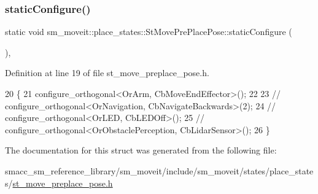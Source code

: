 \subsubsection{\texorpdfstring{static\+Configure()}{staticConfigure()}}
{\footnotesize\ttfamily static void sm\+\_\+moveit\+::place\+\_\+states\+::\+St\+Move\+Pre\+Place\+Pose\+::static\+Configure (\begin{DoxyParamCaption}{ }\end{DoxyParamCaption})\hspace{0.3cm}{\ttfamily [inline]}, {\ttfamily [static]}}



Definition at line 19 of file st\+\_\+move\+\_\+preplace\+\_\+pose.\+h.


\begin{DoxyCode}
20     \{
21         configure\_orthogonal<OrArm, CbMoveEndEffector>();
22 
23         \textcolor{comment}{//   configure\_orthogonal<OrNavigation, CbNavigateBackwards>(2);}
24         \textcolor{comment}{//   configure\_orthogonal<OrLED, CbLEDOff>();}
25         \textcolor{comment}{//   configure\_orthogonal<OrObstaclePerception, CbLidarSensor>();}
26     \}
\end{DoxyCode}


The documentation for this struct was generated from the following file\+:\begin{DoxyCompactItemize}
\item 
smacc\+\_\+sm\+\_\+reference\+\_\+library/sm\+\_\+moveit/include/sm\+\_\+moveit/states/place\+\_\+states/\hyperlink{st__move__preplace__pose_8h}{st\+\_\+move\+\_\+preplace\+\_\+pose.\+h}\end{DoxyCompactItemize}

